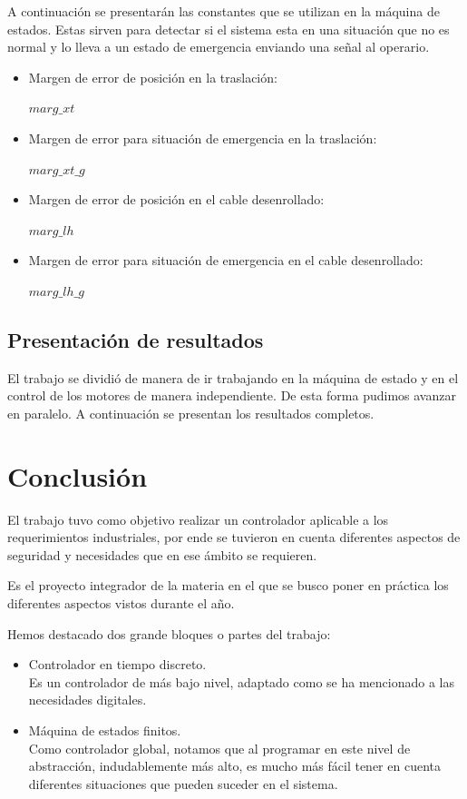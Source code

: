 \documentclass[journal]{IEEEtran}
\begin{document}
A continuación se presentarán las constantes que se utilizan en la máquina de estados.
Estas sirven para detectar si el sistema esta en una situación que no es normal
y lo lleva a un estado de emergencia enviando una señal al operario.


\begin{itemize}
 \item Margen de error de posición en la traslación: 
 
 $marg\_xt$
 \item Margen de error para situación de emergencia en la traslación:
 
 $marg\_xt\_g$
  \item Margen de error de posición en el cable desenrollado: 
 
 $marg\_lh$
 \item Margen de error para situación de emergencia en el cable desenrollado:
 
 $marg\_lh\_g$
 
\end{itemize}

\subsection{Presentación de resultados}

El trabajo se dividió de manera de ir trabajando en la máquina de estado y en el
control de los motores de manera independiente. De esta forma pudimos avanzar 
en paralelo. A continuación se presentan los resultados completos.

\newpage 
\section{Conclusión}
El trabajo tuvo como objetivo realizar un controlador aplicable a los requerimientos
industriales, por ende se tuvieron en cuenta diferentes aspectos de seguridad y 
necesidades que en ese ámbito se requieren.

Es el proyecto integrador de la materia en el que se busco poner en práctica los diferentes
aspectos vistos durante el año.

Hemos destacado dos grande bloques o partes del trabajo:

\begin{itemize}

\item Controlador en tiempo discreto.\\
Es un controlador de más bajo nivel, adaptado como se ha mencionado a las necesidades
digitales.

\item Máquina de estados finitos.\\
Como controlador global, notamos que al programar en este nivel de abstracción, indudablemente
más alto, es mucho más fácil tener en cuenta diferentes situaciones que pueden suceder
en el sistema. 

\end{itemize}
\end{document}
